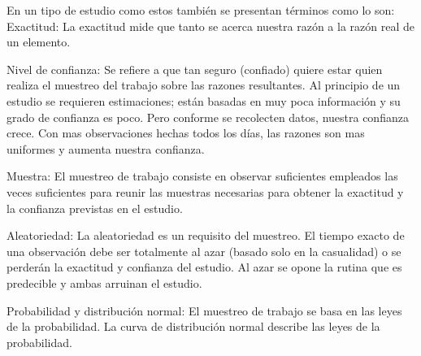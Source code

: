     
        En un tipo de estudio como estos también se presentan términos como lo son:
        Exactitud: La exactitud mide que tanto se acerca nuestra razón a la razón real de un elemento.
    
        Nivel de confianza: Se refiere a que tan seguro (confiado) quiere estar quien realiza el muestreo del trabajo sobre las razones resultantes. Al principio de un estudio se requieren estimaciones; están basadas en muy poca información y su grado de confianza es poco. Pero conforme se recolecten datos, nuestra confianza crece. Con mas observaciones hechas todos los días, las razones son mas uniformes y aumenta nuestra confianza.
    
        Muestra: El muestreo de trabajo consiste en observar suficientes empleados las veces suficientes para reunir las muestras necesarias para obtener la exactitud y la confianza previstas en el estudio.
    
        Aleatoriedad: La aleatoriedad es un requisito del muestreo. El tiempo exacto de una observación debe ser totalmente al azar (basado solo en la casualidad) o se perderán la exactitud y confianza del estudio. Al azar se opone la rutina que es predecible y ambas arruinan el estudio.
    
        Probabilidad y distribución normal: El muestreo de trabajo se basa en las leyes de la probabilidad. La curva de distribución normal describe las leyes de la probabilidad.
        \cite{Fundamentacion}
